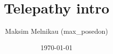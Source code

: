 \documentclass{beamer}
\begin{document}
\title{Telepathy intro}
\author{Maksim Melnikau (max\_posedon)}
\date{\today}
\frame{\titlepage}
\end{document}
